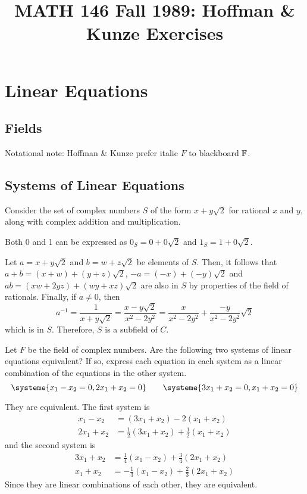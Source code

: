 \documentclass[notes]{agony}
\title{MATH 146 Fall 1989: Hoffman \& Kunze Exercises}
\begin{document}
\thispagestyle{firstpage}
\renewcommand{\contentsname}{MATH 146 Fall 1989:\\{\huge Exercises from Hoffman \& Kunze, \emph{Linear Algebra}, 2nd ed.}}
\tableofcontents

\chapter{Linear Equations}
\section{Fields}\label{sec:fields}
Notational note: Hoffman \& Kunze prefer italic $F$ to blackboard $\mathbb{F}$.

\section{Systems of Linear Equations}

\begin{prf}
  Consider the set of complex numbers $S$ of the form $x + y\sqrt2$ for rational $x$ and $y$,
  along with complex addition and multiplication.

  Both 0 and 1 can be expressed as $0_S = 0+0\sqrt2$ and $1_S = 1 + 0\sqrt2$.

  Let $a = x + y\sqrt2$ and $b = w + z\sqrt2$ be elements of $S$.
  Then, it follows that $a+b = (x+w) + (y+z)\sqrt2$, $-a = (-x) + (-y)\sqrt2$
  and $ab = (xw + 2yz) + (wy + xz)\sqrt2$ are also in $S$ by properties of the field of rationals.
  Finally, if $a \neq 0$, then
  \[ a^{-1} = \frac{1}{x+y\sqrt2} = \frac{x-y\sqrt2}{x^2-2y^2} = \frac{x}{x^2-2y^2} + \frac{-y}{x^2-2y^2}\sqrt2 \]
  which is in $S$.
  Therefore, $S$ is a subfield of $C$.
\end{prf}

\begin{xca}\label{xca:sysequiv}
  Let $F$ be the field of complex numbers.
  Are the following two systems of linear equations equivalent?
  If so, express each equation in each system as a linear combination of the equations in the other system.
  \[ \systeme{x_1-x_2=0, 2x_1+x_2=0} \qquad \systeme{3x_1+x_2=0, x_1+x_2=0} \]
\end{xca}
\begin{prf}
  They are equivalent. The first system is
  \begin{align*}
    x_1 - x_2  & = (3x_1 + x_2) - 2(x_1 + x_2)                \\
    2x_1 + x_2 & = \tfrac12(3x_1 + x_2) + \tfrac12(x_1 + x_2)
  \end{align*}
  and the second system is
  \begin{align*}
    3x_1 + x_2 & = \tfrac14(x_1 - x_2) + \tfrac34(2x_1 + x_2)  \\
    x_1 + x_2  & = -\tfrac13(x_1 - x_2) + \tfrac23(2x_1 + x_2)
  \end{align*}
  Since they are linear combinations of each other, they are equivalent.
\end{prf}
\end{document}
